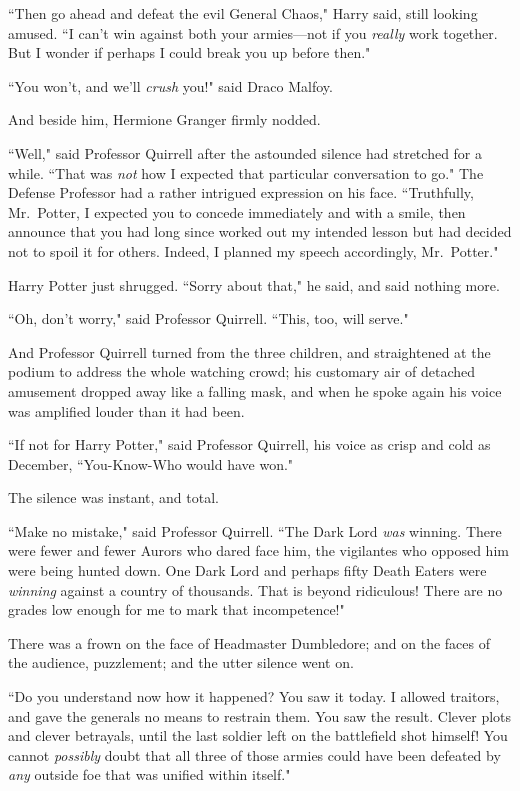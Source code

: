 ``Then go ahead and defeat the evil General Chaos," Harry said, still looking amused. ``I can't win against both your armies—not if you \emph{really} work together. But I wonder if perhaps I could break you up before then."

``You won't, and we'll \emph{crush} you!" said Draco Malfoy.

And beside him, Hermione Granger firmly nodded.

``Well," said Professor Quirrell after the astounded silence had stretched for a while. ``That was \emph{not} how I expected that particular conversation to go." The Defense Professor had a rather intrigued expression on his face. ``Truthfully, Mr.~Potter, I expected you to concede immediately and with a smile, then announce that you had long since worked out my intended lesson but had decided not to spoil it for others. Indeed, I planned my speech accordingly, Mr.~Potter."

Harry Potter just shrugged. ``Sorry about that," he said, and said nothing more.

``Oh, don't worry," said Professor Quirrell. ``This, too, will serve."

And Professor Quirrell turned from the three children, and straightened at the podium to address the whole watching crowd; his customary air of detached amusement dropped away like a falling mask, and when he spoke again his voice was amplified louder than it had been.

``If not for Harry Potter," said Professor Quirrell, his voice as crisp and cold as December, ``You-Know-Who would have won."

The silence was instant, and total.

\later

``Make no mistake," said Professor Quirrell. ``The Dark Lord \emph{was} winning. There were fewer and fewer Aurors who dared face him, the vigilantes who opposed him were being hunted down. One Dark Lord and perhaps fifty Death Eaters were \emph{winning} against a country of thousands. That is beyond ridiculous! There are no grades low enough for me to mark that incompetence!"

There was a frown on the face of Headmaster Dumbledore; and on the faces of the audience, puzzlement; and the utter silence went on.

``Do you understand now how it happened? You saw it today. I allowed traitors, and gave the generals no means to restrain them. You saw the result. Clever plots and clever betrayals, until the last soldier left on the battlefield shot himself! You cannot \emph{possibly} doubt that all three of those armies could have been defeated by \emph{any} outside foe that was unified within itself."

